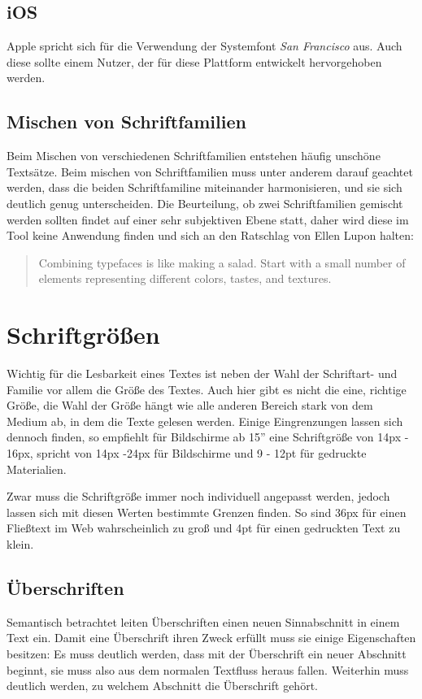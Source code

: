 \subsection{iOS}
Apple spricht sich für die Verwendung der Systemfont \textit{San Francisco} aus. Auch diese sollte einem Nutzer, der für diese Plattform entwickelt hervorgehoben werden.

\subsection{Mischen von Schriftfamilien}
Beim Mischen von verschiedenen Schriftfamilien entstehen häufig unschöne Textsätze. Beim mischen von Schriftfamilien muss unter anderem darauf geachtet werden, dass die beiden Schriftfamiline miteinander harmonisieren, und sie sich deutlich genug unterscheiden.
Die Beurteilung, ob zwei Schriftfamilien gemischt werden sollten  findet auf einer sehr subjektiven Ebene statt, daher wird diese im Tool keine Anwendung finden und sich an den Ratschlag von Ellen Lupon halten:
\begin{quote}
	Combining typefaces is like making a salad. Start with a small number of elements representing different colors, tastes, and textures.\cite{lupton2014thinking}
\end{quote}


\section{Schriftgrößen}
Wichtig für die Lesbarkeit eines Textes ist neben der Wahl der Schriftart- und Familie vor allem die Größe des Textes. Auch hier gibt es nicht die eine, richtige Größe, die Wahl der Größe hängt wie alle anderen Bereich stark von dem Medium ab, in dem die Texte gelesen werden.
Einige Eingrenzungen lassen sich dennoch finden, so empfiehlt \cite{Runk200804} für Bildschirme ab 15” eine Schriftgröße von 14px - 16px, \cite{Lehnert201602} spricht von 14px -24px für Bildschirme und 9 - 12pt für gedruckte Materialien.

Zwar muss die Schriftgröße immer noch individuell angepasst werden, jedoch lassen sich mit diesen Werten bestimmte Grenzen finden. So sind 36px für einen Fließtext im Web wahrscheinlich zu groß und 4pt für einen gedruckten Text zu klein.

\subsection{Überschriften}
Semantisch betrachtet leiten Überschriften einen neuen Sinnabschnitt in einem Text ein. Damit eine Überschrift ihren Zweck erfüllt muss sie einige Eigenschaften besitzen:
Es muss deutlich werden, dass mit der Überschrift ein neuer Abschnitt beginnt, sie muss also aus dem normalen Textfluss heraus fallen. Weiterhin muss deutlich werden, zu welchem Abschnitt die Überschrift gehört.

